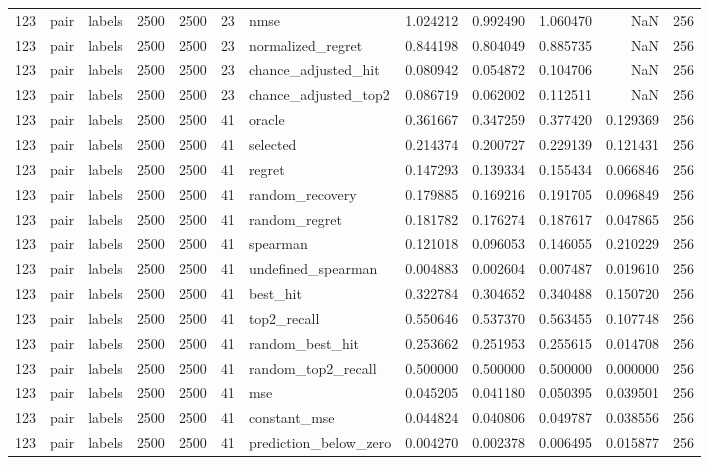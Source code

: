 \begin{tabular}{rllrrrlrrrrr}
123 & pair & labels & 2500 & 2500 & 23 & nmse & 1.024212 & 0.992490 & 1.060470 & NaN & 256 \\
123 & pair & labels & 2500 & 2500 & 23 & normalized_regret & 0.844198 & 0.804049 & 0.885735 & NaN & 256 \\
123 & pair & labels & 2500 & 2500 & 23 & chance_adjusted_hit & 0.080942 & 0.054872 & 0.104706 & NaN & 256 \\
123 & pair & labels & 2500 & 2500 & 23 & chance_adjusted_top2 & 0.086719 & 0.062002 & 0.112511 & NaN & 256 \\
123 & pair & labels & 2500 & 2500 & 41 & oracle & 0.361667 & 0.347259 & 0.377420 & 0.129369 & 256 \\
123 & pair & labels & 2500 & 2500 & 41 & selected & 0.214374 & 0.200727 & 0.229139 & 0.121431 & 256 \\
123 & pair & labels & 2500 & 2500 & 41 & regret & 0.147293 & 0.139334 & 0.155434 & 0.066846 & 256 \\
123 & pair & labels & 2500 & 2500 & 41 & random_recovery & 0.179885 & 0.169216 & 0.191705 & 0.096849 & 256 \\
123 & pair & labels & 2500 & 2500 & 41 & random_regret & 0.181782 & 0.176274 & 0.187617 & 0.047865 & 256 \\
123 & pair & labels & 2500 & 2500 & 41 & spearman & 0.121018 & 0.096053 & 0.146055 & 0.210229 & 256 \\
123 & pair & labels & 2500 & 2500 & 41 & undefined_spearman & 0.004883 & 0.002604 & 0.007487 & 0.019610 & 256 \\
123 & pair & labels & 2500 & 2500 & 41 & best_hit & 0.322784 & 0.304652 & 0.340488 & 0.150720 & 256 \\
123 & pair & labels & 2500 & 2500 & 41 & top2_recall & 0.550646 & 0.537370 & 0.563455 & 0.107748 & 256 \\
123 & pair & labels & 2500 & 2500 & 41 & random_best_hit & 0.253662 & 0.251953 & 0.255615 & 0.014708 & 256 \\
123 & pair & labels & 2500 & 2500 & 41 & random_top2_recall & 0.500000 & 0.500000 & 0.500000 & 0.000000 & 256 \\
123 & pair & labels & 2500 & 2500 & 41 & mse & 0.045205 & 0.041180 & 0.050395 & 0.039501 & 256 \\
123 & pair & labels & 2500 & 2500 & 41 & constant_mse & 0.044824 & 0.040806 & 0.049787 & 0.038556 & 256 \\
123 & pair & labels & 2500 & 2500 & 41 & prediction_below_zero & 0.004270 & 0.002378 & 0.006495 & 0.015877 & 256 \\

\end{tabular}
